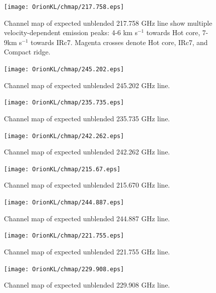 \begin{figure}[H]
  \centering
  \texttt{[image: OrionKL/chmap/217.758.eps]}
  \caption{
  Channel map of expected unblended 217.758 GHz line show multiple velocity-dependent 
  emission peaks: 4-6 km s$^{-1}$ towards Hot core, 7-9km s$^{-1}$ towards IRc7. 
  Magenta crosses denote Hot core, IRc7, and Compact ridge.}
  \label{ch_0}
\end{figure}

\begin{figure}[H]
  \centering
  \texttt{[image: OrionKL/chmap/245.202.eps]}
  \caption{Channel map of expected unblended 245.202 GHz line.}
  \label{ch_1}
\end{figure}

\begin{figure}[H]
  \centering
  \texttt{[image: OrionKL/chmap/235.735.eps]}
  \caption{Channel map of expected unblended 235.735 GHz line.}
  \label{ch_2}
\end{figure}

\begin{figure}[H]
  \centering
  \texttt{[image: OrionKL/chmap/242.262.eps]}
  \caption{Channel map of expected unblended 242.262 GHz line.}
  \label{ch_3}
\end{figure}

\begin{figure}[H]
  \centering
  \texttt{[image: OrionKL/chmap/215.67.eps]}
  \caption{Channel map of expected unblended 215.670 GHz line.}
  \label{ch_4}
\end{figure}

\begin{figure}[H]
  \centering
  \texttt{[image: OrionKL/chmap/244.887.eps]}
  \caption{Channel map of expected unblended 244.887 GHz line.}
  \label{ch_5}
\end{figure}

\begin{figure}[H]
  \centering
  \texttt{[image: OrionKL/chmap/221.755.eps]}
  \caption{Channel map of expected unblended 221.755 GHz line.}
  \label{ch_6}
\end{figure}

\begin{figure}[H]
  \centering
  \texttt{[image: OrionKL/chmap/229.908.eps]}
  \caption{Channel map of expected unblended 229.908 GHz line.}
  \label{ch_7}
\end{figure}

